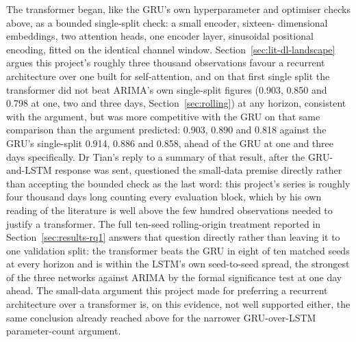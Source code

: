 \documentclass[12pt,a4paper]{report}
\begin{document}
The transformer began, like the GRU's own hyperparameter and optimiser
checks above, as a bounded single-split check: a small encoder, sixteen-
dimensional embeddings, two attention heads, one encoder layer, sinusoidal
positional encoding, fitted on the identical channel window.
Section~\ref{sec:lit-dl-landscape} argues this project's roughly three
thousand observations favour a recurrent architecture over one built for
self-attention, and on that first single split the transformer did not
beat ARIMA's own single-split figures (0.903, 0.850 and 0.798 at one, two
and three days, Section~\ref{sec:rolling}) at any horizon, consistent with
the argument, but was more competitive with the GRU on that same
comparison than the argument predicted: 0.903, 0.890 and 0.818 against the
GRU's single-split 0.914, 0.886 and 0.858, ahead of the GRU at one and
three days specifically. Dr Tian's reply to a summary of that result,
after the GRU-and-LSTM response was sent, questioned the small-data
premise directly rather than accepting the bounded check as the last word:
this project's series is roughly four thousand days long counting every
evaluation block, which by his own reading of the literature is well above
the few hundred observations needed to justify a transformer. The full
ten-seed rolling-origin treatment reported in Section~\ref{sec:results-rq1}
answers that question directly rather than leaving it to one validation
split: the transformer beats the GRU in eight of ten matched seeds at
every horizon and is within the LSTM's own seed-to-seed spread, the
strongest of the three networks against ARIMA by the formal significance
test at one day ahead. The small-data argument this project made for
preferring a recurrent architecture over a transformer is, on this
evidence, not well supported either, the same conclusion already reached
above for the narrower GRU-over-LSTM parameter-count argument.
\end{document}

